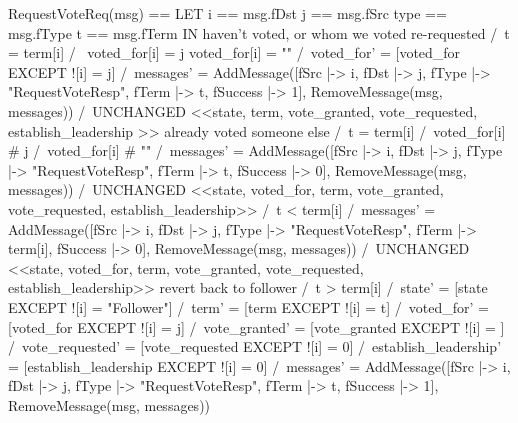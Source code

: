 \documentclass{report}
\begin{document}
\begin{tla}
RequestVoteReq(msg) == 
    LET 
        i == msg.fDst
        j == msg.fSrc
        type == msg.fType
        t == msg.fTerm
    IN 
        \* haven't voted, or whom we voted re-requested
        \/ /\ t = term[i]
           /\ \/ voted_for[i] = j 
              \/ voted_for[i] = ""
           /\ voted_for' = [voted_for EXCEPT ![i] = j]
           /\ messages' = AddMessage([fSrc |-> i, 
                                        fDst |-> j, 
                                        fType |-> "RequestVoteResp",
                                        fTerm |-> t, 
                                        fSuccess |-> 1],
                                        RemoveMessage(msg, messages))
           /\ UNCHANGED <<state, term, vote_granted, vote_requested, establish_leadership >>
        \* already voted someone else
        \/ /\ t = term[i]
           /\ voted_for[i] # j 
           /\ voted_for[i] # ""
           /\ messages' = AddMessage([fSrc |-> i, 
                                        fDst |-> j, 
                                        fType |-> "RequestVoteResp",
                                        fTerm |-> t, 
                                        fSuccess |-> 0],
                                        RemoveMessage(msg, messages))
            /\ UNCHANGED <<state, voted_for, term, vote_granted, vote_requested, establish_leadership>>
        \/  /\ t < term[i]
            /\ messages' = AddMessage([fSrc |-> i, 
                                        fDst |-> j, 
                                        fType |-> "RequestVoteResp",
                                        fTerm |-> term[i], 
                                        fSuccess |-> 0],
                                        RemoveMessage(msg, messages))
            /\ UNCHANGED <<state, voted_for, term, vote_granted, vote_requested, establish_leadership>>
        \* revert back to follower
        \/  /\ t > term[i]
            /\ state' = [state EXCEPT ![i] = "Follower"]
            /\ term' = [term EXCEPT ![i] = t]
            /\ voted_for' = [voted_for EXCEPT ![i] = j]
            /\ vote_granted' = [vote_granted EXCEPT ![i] = {}]
            /\ vote_requested' = [vote_requested EXCEPT ![i] = 0]
            /\ establish_leadership' = [establish_leadership EXCEPT ![i] = 0]
            /\ messages' = AddMessage([fSrc |-> i, 
                                        fDst |-> j, 
                                        fType |-> "RequestVoteResp",
                                        fTerm |-> t, 
                                        fSuccess |-> 1],
                                        RemoveMessage(msg, messages))
\end{tla}
\end{document}
